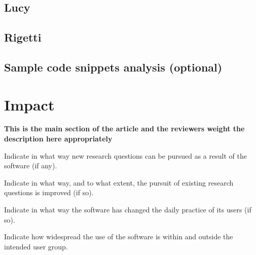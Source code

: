 \documentclass[preprint,12pt, a4paper]{elsarticle}
\newcommand{\ket}[1]{\ensuremath{|#1\rangle}}
\newcommand{\1}{{\rm 1\hspace{-0.9mm}l}}
\newcommand{\Id}{{\rm 1\hspace{-0.9mm}l}}
\newcommand{\ee}{\ensuremath{\mathrm{e}}}
\newcommand{\ii}{\ensuremath{\mathrm{i}}}
\newcommand{\PP}{\mathcal{P}}
\begin{document}
\subsection{Lucy}

\subsection{Rigetti}


\subsection{Sample code snippets analysis (optional)}
\label{}










\section{Impact }


\textbf{This is the main section of the article and the reviewers weight the 
description here appropriately}

Indicate in what way new research questions can be pursued as a result of the 
software (if any).

Indicate in what way, and to what extent, the pursuit of existing research 
questions is improved (if so).

Indicate in what way the software has changed the daily practice of its users 
(if so).

Indicate how widespread the use of the software is within and outside the 
intended user group.
\end{document}

